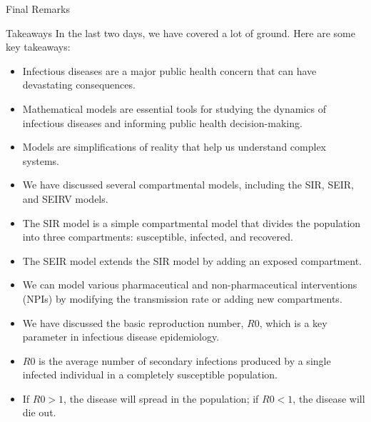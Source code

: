 \documentclass[
  ignorenonframetext,
]{beamer}
\begin{document}
\begin{frame}{Final Remarks}
\label{final-remarks}
\begin{block}{Takeaways}
\label{takeaways}
In the last two days, we have covered a lot of ground. Here are some key
takeaways:

\begin{itemize}
\item
  Infectious diseases are a major public health concern that can have
  devastating consequences.
\item
  Mathematical models are essential tools for studying the dynamics of
  infectious diseases and informing public health decision-making.
\item
  Models are simplifications of reality that help us understand complex
  systems.
\end{itemize}
\end{block}
\end{frame}

\begin{frame}
\begin{itemize}
\item
  We have discussed several compartmental models, including the SIR,
  SEIR, and SEIRV models.
\item
  The SIR model is a simple compartmental model that divides the
  population into three compartments: susceptible, infected, and
  recovered.
\item
  The SEIR model extends the SIR model by adding an exposed compartment.
\item
  We can model various pharmaceutical and non-pharmaceutical
  interventions (NPIs) by modifying the transmission rate or adding new
  compartments.
\end{itemize}
\end{frame}

\begin{frame}
\begin{itemize}
\item
  We have discussed the basic reproduction number, \(R0\), which is a
  key parameter in infectious disease epidemiology.
\item
  \(R0\) is the average number of secondary infections produced by a
  single infected individual in a completely susceptible population.
\item
  If \(R0 > 1\), the disease will spread in the population; if
  \(R0 < 1\), the disease will die out.
\end{itemize}
\end{frame}
\end{document}
